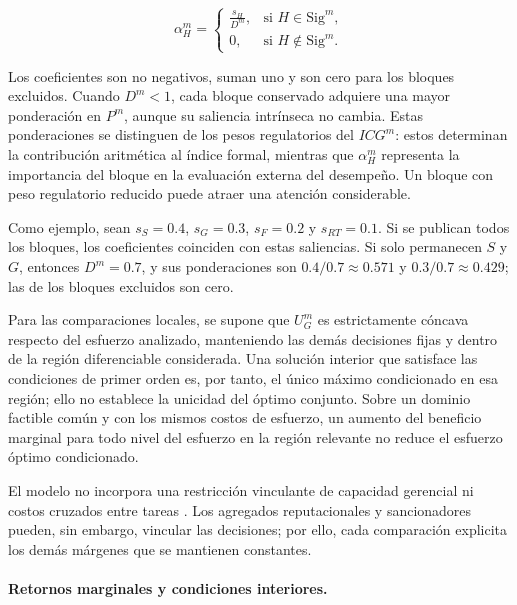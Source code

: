 \begin{equation}
\label{eq:ponderaciones_reputacionales}
\alpha_H^m
=
\begin{cases}
\displaystyle
\frac{s_H}{D^m},
&
\text{si } H\in\mathrm{Sig}^m,
\\[8pt]
0,
&
\text{si } H\notin\mathrm{Sig}^m.
\end{cases}
\end{equation}

Los coeficientes son no negativos, suman uno y son cero para los bloques excluidos. Cuando \(D^m<1\), cada bloque conservado adquiere una mayor ponderación en \(P^m\), aunque su saliencia intrínseca no cambia. Estas ponderaciones se distinguen de los pesos regulatorios del \(ICG^m\): estos determinan la contribución aritmética al índice formal, mientras que \(\alpha_H^m\) representa la importancia del bloque en la evaluación externa del desempeño. Un bloque con peso regulatorio reducido puede atraer una atención considerable.

Como ejemplo, sean \(s_S=0.4\), \(s_G=0.3\), \(s_F=0.2\) y \(s_{RT}=0.1\). Si se publican todos los bloques, los coeficientes coinciden con estas saliencias. Si solo permanecen \(S\) y \(G\), entonces \(D^m=0.7\), y sus ponderaciones son \(0.4/0.7\approx0.571\) y \(0.3/0.7\approx0.429\); las de los bloques excluidos son cero.

Para las comparaciones locales, se supone que \(U_G^m\) es estrictamente cóncava respecto del esfuerzo analizado, manteniendo las demás decisiones fijas y dentro de la región diferenciable considerada. Una solución interior que satisface las condiciones de primer orden es, por tanto, el único máximo condicionado en esa región; ello no establece la unicidad del óptimo conjunto. Sobre un dominio factible común y con los mismos costos de esfuerzo, un aumento del beneficio marginal para todo nivel del esfuerzo en la región relevante no reduce el esfuerzo óptimo condicionado.

El modelo no incorpora una restricción vinculante de capacidad gerencial ni costos cruzados entre tareas \citep{holmstrom1991multitask}. Los agregados reputacionales y sancionadores pueden, sin embargo, vincular las decisiones; por ello, cada comparación explicita los demás márgenes que se mantienen constantes.

\paragraph{Retornos marginales y condiciones interiores.}

